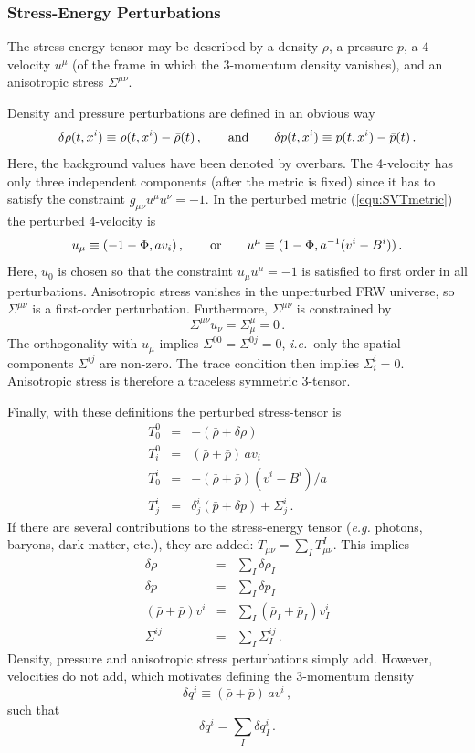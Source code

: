 \documentclass[12pt,letterpaper,rotate]{article}
\def\beq{\begin{equation}}
\def\eeq{\end{equation}}
\def\bea{\begin{eqnarray}}
\def\eea{\end{eqnarray}}
\begin{document}
{\subsubsection{Stress-Energy Perturbations}

The stress-energy tensor may be described by a density $\rho$, a pressure $p$, a 4-velocity $u^\mu$ (of the frame in which the 3-momentum density vanishes), and an anisotropic stress $\Sigma^{\mu \nu}$.

Density and pressure perturbations are defined in an obvious way
\beq
\delta \rho(t, x^i) \equiv \rho(t,x^i) - \bar \rho(t)\, , \qquad {\rm and} \qquad \delta p(t, x^i) \equiv p(t, x^i) - \bar p(t)\, .
\eeq
Here, the background values have been denoted by overbars. 
The 4-velocity has only three independent components (after the metric is fixed) since it has to satisfy the constraint $g_{\mu \nu} u^\mu u^\nu = -1$.
In the perturbed metric (\ref{equ:SVTmetric}) the perturbed 4-velocity is
\beq
u_\mu \equiv (-1-\Phi, a v_i) \, , \qquad {\rm or} \qquad u^\mu \equiv (1 -\Phi, a^{-1}(v^i - B^i))\, .
\eeq
Here, $u_0$ is chosen so that the constraint $u_\mu u^\mu = -1$ is satisfied to first order in all perturbations.
Anisotropic stress vanishes in the unperturbed FRW universe, so $\Sigma^{\mu \nu}$ is a first-order perturbation. Furthermore, $\Sigma^{\mu \nu}$ is constrained by
\beq
\Sigma^{\mu \nu} u_\nu = \Sigma^\mu_\mu = 0\, .
\eeq
The orthogonality with $u_\mu$ implies $\Sigma^{0 0} = \Sigma^{0 j} = 0$, {\it i.e.}~only the spatial components $\Sigma^{ij}$ are non-zero. The trace condition then implies $\Sigma^i_i=0$. Anisotropic stress is therefore a traceless symmetric 3-tensor.

Finally, with these definitions the perturbed stress-tensor is
\bea
T^0_0 &=& - (\bar \rho + \delta \rho) \\
T^0_i &=& (\bar \rho +\bar p)\, a v_i \\
T^i_0 &=& -(\bar \rho + \bar p) (v^i - B^i)/a \\
T^i_j &=& \delta^i_j (\bar p + \delta p) + \Sigma^i_j\, .
\eea
If there are several contributions to the stress-energy tensor ({\it e.g.} photons, baryons, dark matter, etc.), they are added: $T_{\mu \nu} = \sum_I T^I_{\mu \nu}$. This implies
\begin{eqnarray}
\delta \rho &=& \sum_I \delta \rho_I \\
\delta p &=& \sum_I \delta p_I \\
(\bar \rho + \bar p) v^i &=& \sum_I (\bar \rho_I + \bar p_I) v_I^i \\
\Sigma^{ij} &=& \sum_I \Sigma_I^{ij}\, .
\end{eqnarray}
Density, pressure and anisotropic stress perturbations simply add. However, velocities do not add, which motivates defining the 3-momentum density
\beq
\delta q^i \equiv (\bar \rho + \bar p) \, av^i\, ,
\eeq
such that
\beq
\delta q^i = \sum_I \delta q^i_I\, .
\eeq


}
\end{document}
